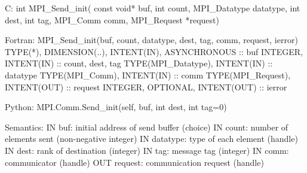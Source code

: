C:
int MPI_Send_init(
  const void* buf, int count, MPI_Datatype datatype,
  int dest, int tag, MPI_Comm comm, MPI_Request *request)

Fortran:
MPI_Send_init(buf, count, datatype, dest, tag, comm, request, ierror)
TYPE(*), DIMENSION(..), INTENT(IN), ASYNCHRONOUS :: buf
INTEGER, INTENT(IN) :: count, dest, tag
TYPE(MPI_Datatype), INTENT(IN) :: datatype
TYPE(MPI_Comm), INTENT(IN) :: comm
TYPE(MPI_Request), INTENT(OUT) :: request
INTEGER, OPTIONAL, INTENT(OUT) :: ierror

Python:
MPI.Comm.Send_init(self, buf, int dest, int tag=0)

Semantics:
IN buf: initial address of send buffer (choice)
IN count: number of elements sent (non-negative integer)
IN datatype: type of each element (handle)
IN dest: rank of destination (integer)
IN tag: message tag (integer)
IN comm: communicator (handle)
OUT request: communication request (handle)
